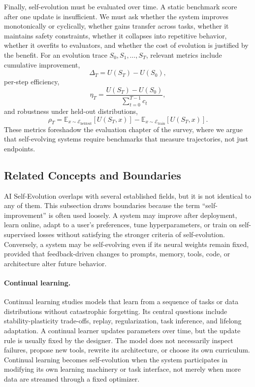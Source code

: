 Finally, self-evolution must be evaluated over time. A static benchmark score after one update is insufficient. We must ask whether the system improves monotonically or cyclically, whether gains transfer across tasks, whether it maintains safety constraints, whether it collapses into repetitive behavior, whether it overfits to evaluators, and whether the cost of evolution is justified by the benefit. For an evolution trace $S_0,S_1,\ldots,S_T$, relevant metrics include cumulative improvement,
\begin{equation}
\Delta_T = U(S_T)-U(S_0),
\end{equation}
per-step efficiency,
\begin{equation}
\eta_T = \frac{U(S_T)-U(S_0)}{\sum_{t=0}^{T-1} c_t},
\end{equation}
and robustness under held-out distributions,
\begin{equation}
\rho_T = \mathbb{E}_{x\sim\mathcal{E}_{\mathrm{heldout}}}[U(S_T,x)] - \mathbb{E}_{x\sim\mathcal{E}_{\mathrm{train}}}[U(S_T,x)].
\end{equation}
These metrics foreshadow the evaluation chapter of the survey, where we argue that self-evolving systems require benchmarks that measure trajectories, not just endpoints.

\subsection{Related Concepts and Boundaries}
\label{subsec:intro-related}

AI Self-Evolution overlaps with several established fields, but it is not identical to any of them. This subsection draws boundaries because the term ``self-improvement'' is often used loosely. A system may improve after deployment, learn online, adapt to a user's preferences, tune hyperparameters, or train on self-supervised losses without satisfying the stronger criteria of self-evolution. Conversely, a system may be self-evolving even if its neural weights remain fixed, provided that feedback-driven changes to prompts, memory, tools, code, or architecture alter future behavior.

\paragraph{Continual learning.} Continual learning studies models that learn from a sequence of tasks or data distributions without catastrophic forgetting. Its central questions include stability-plasticity trade-offs, replay, regularization, task inference, and lifelong adaptation. A continual learner updates parameters over time, but the update rule is usually fixed by the designer. The model does not necessarily inspect failures, propose new tools, rewrite its architecture, or choose its own curriculum. Continual learning becomes self-evolution when the system participates in modifying its own learning machinery or task interface, not merely when more data are streamed through a fixed optimizer.

